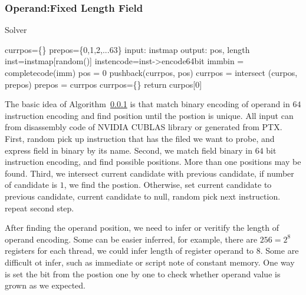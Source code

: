 \documentclass{sig-alternate-05-2015}
\begin{document}
\subsubsection{Operand:Fixed Length Field}
\begin{algorithm}
      \caption{Solver}\label{integer_solver}
      \label{algo:int_solver}
  \begin{algorithmic}[1]
      \State currpos=\{\}
      \State prepos=\{0,1,2,...63\}
      \State input: instmap
      \State output: pos, length
      \State inst=instmap[random()]
      \State instencode=inst->encode64bit
      \State immbin = completecode(imm)
      \State pos = 0
      \State pushback(currpos, pos)
      \EndIf
      \EndWhile
      \State currpos = intersect (curpos, prepos)
      \State prepos = currpos
      \State currpos=\{\}
      \EndIf
      \EndWhile
      \State return curpos[0]
  \end{algorithmic}
\end{algorithm}
The basic idea of Algorithm~\ref{} is that match binary encoding of operand in $64$ instruction encoding and find
position until the postion is unique. All input can from disassembly code of NVIDIA CUBLAS library or generated from PTX.
First, random pick up instruction that has the filed we want to probe, and express field in binary by its name. Second, we match field binary in $64$
bit instruction encoding, and find possible positions. More than one positions may be found. Third, we intersect current candidate
with previous candidate, if number of candidate is $1$, we find the postion. Otherwise, set current candidate to previous candidate,
current candidate to null, random pick next instruction. repeat second step.

After finding the operand position, we need to infer or veritify the length of operand encoding. Some can be easier
inferred, for example, there are $256=2^{8}$ registers for each thread, we could infer length of register operand to $8$.
Some are difficult ot infer, such as immediate or script note of constant memory. One way is set the bit from the
postion one by one to check whether operand value is grown as we expected.
\end{document}
